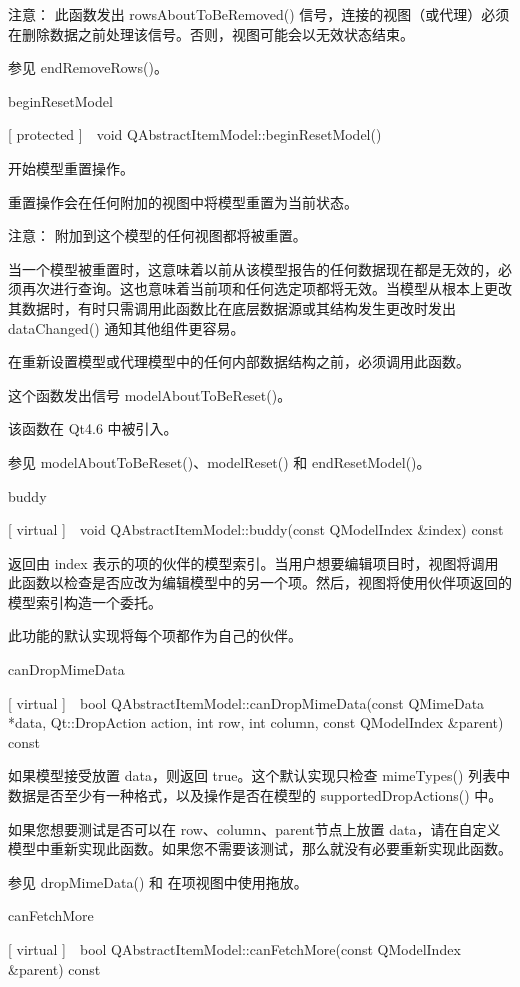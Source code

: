 注意： 此函数发出 rowsAboutToBeRemoved() 信号，连接的视图（或代理）必须在删除数据之前处理该信号。否则，视图可能会以无效状态结束。

参见 endRemoveRows()。

beginResetModel

[ protected ] void QAbstractItemModel::beginResetModel()

开始模型重置操作。

重置操作会在任何附加的视图中将模型重置为当前状态。

注意： 附加到这个模型的任何视图都将被重置。

当一个模型被重置时，这意味着以前从该模型报告的任何数据现在都是无效的，必须再次进行查询。这也意味着当前项和任何选定项都将无效。当模型从根本上更改其数据时，有时只需调用此函数比在底层数据源或其结构发生更改时发出 dataChanged() 通知其他组件更容易。

在重新设置模型或代理模型中的任何内部数据结构之前，必须调用此函数。

这个函数发出信号 modelAboutToBeReset()。

该函数在 Qt4.6 中被引入。

参见 modelAboutToBeReset()、modelReset() 和 endResetModel()。

buddy

[ virtual ] void QAbstractItemModel::buddy(const QModelIndex \&index) const

返回由 index 表示的项的伙伴的模型索引。当用户想要编辑项目时，视图将调用此函数以检查是否应改为编辑模型中的另一个项。然后，视图将使用伙伴项返回的模型索引构造一个委托。

此功能的默认实现将每个项都作为自己的伙伴。

canDropMimeData

[ virtual ] bool QAbstractItemModel::canDropMimeData(const QMimeData *data, Qt::DropAction action, int row, int column, const QModelIndex \&parent) const

如果模型接受放置 data，则返回 true。这个默认实现只检查 mimeTypes() 列表中数据是否至少有一种格式，以及操作是否在模型的 supportedDropActions() 中。

如果您想要测试是否可以在 row、column、parent节点上放置 data，请在自定义模型中重新实现此函数。如果您不需要该测试，那么就没有必要重新实现此函数。

参见 dropMimeData() 和 在项视图中使用拖放。

canFetchMore

[ virtual ] bool QAbstractItemModel::canFetchMore(const QModelIndex \&parent) const


